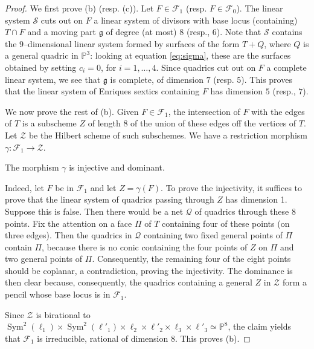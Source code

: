 \documentclass[11pt]{amsart}
\theoremstyle{definition}
\def\Sym{\operatorname{Sym}}
\def\PP{{\mathbb P}}
\def\F{{\mathcal F}}
\def\Q{{\mathcal Q}}
\def\x{\times}                   %
\def\cong{\simeq}
\begin{document}
\begin{proof} We first prove (b) (resp. (c)). Let $F \in \F_1$ (resp. $F \in \F_0$). 
The linear system $\mathcal S$ cuts out on $F$ a linear system of divisors with base locus (containing) $T \cap F$ and a moving part $\mathfrak g$ of degree (at most) $8$ (resp., $6$). Note that $\mathcal S$ contains the $9$--dimensional linear system formed by surfaces of the form $T+Q$, where $Q$ is a general quadric in $\PP^ 3$: looking at equation \eqref {eq:sigma}, these are the surfaces obtained by setting $c_i=0$, for $i=1,\ldots,4$. Since quadrics cut out on $F$ a complete linear system, we see that $\mathfrak g$ is complete, of dimension $7$ (resp. $5$). This proves that the linear system of Enriques sextics containing $F$ has dimension $5$ (resp., $7$). 

\color{black} We now prove the rest of (b). Given $F\in \mathcal F_1$, the intersection of $F$ with the edges of $T$ is a subscheme $Z$ of length 8 of the union of these edges off the vertices of $T$. Let $\mathcal Z$ be the Hilbert scheme of such subschemes. We have a restriction morphism
$\gamma: \mathcal F_1\to \mathcal Z$. \medskip


 The morphism $\gamma$ is injective and dominant. \medskip

Indeed, let $F$ be in $\mathcal F_1$ and let $Z=\gamma(F)$. To prove the injectivity, it suffices to prove that the linear system of quadrics passing through $Z$ has dimension 1. Suppose this is false. \color{black} Then there would be a net $\Q$ of quadrics through these $8$ points.  Fix the attention on a face $\Pi$ of $T$ containing four of these points (on three edges). \color{black} Then the quadrics in $\Q$ containing two fixed general points of $\Pi$ contain $\Pi$, because there is no conic containing the four points of $Z$ on $\Pi$ and two general points of $\Pi$. \color{black} 
Consequently, the remaining four of the eight points should be coplanar, a contradiction\color{black}, proving the injectivity. The dominance is then clear because, consequently, the quadrics containing a general $Z$ in $\mathcal Z$ form a pencil whose base locus is in $\mathcal F_1$. \medskip

Since $\mathcal Z$ is birational to \color{black} $\Sym^2(\ell_1) \x \Sym^2(\ell'_1) \x \ell_2 \x \ell'_2 \x \ell_3 \x \ell'_3 \cong \PP^8$, \color{black} the claim yields that $\mathcal F_1$ is irreducible, rational of dimension 8.  \color{black} This proves (b). 
 

\end{proof}
\end{document}
